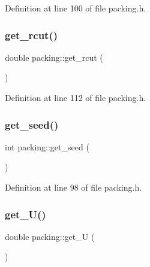 Definition at line 100 of file packing.\+h.

\mbox{\label{classpacking_a9485b9495dbedd5d954bade26a3033b7}} 
\subsubsection{\texorpdfstring{get\+\_\+rcut()}{get\_rcut()}}
{\footnotesize\ttfamily double packing\+::get\+\_\+rcut (\begin{DoxyParamCaption}{ }\end{DoxyParamCaption})\hspace{0.3cm}{\ttfamily [inline]}}



Definition at line 112 of file packing.\+h.

\mbox{\label{classpacking_ac99ab03b903298da3ac29dde9fdd4ad1}} 
\subsubsection{\texorpdfstring{get\+\_\+seed()}{get\_seed()}}
{\footnotesize\ttfamily int packing\+::get\+\_\+seed (\begin{DoxyParamCaption}{ }\end{DoxyParamCaption})\hspace{0.3cm}{\ttfamily [inline]}}



Definition at line 98 of file packing.\+h.

\mbox{\label{classpacking_ac2544dd44e1dd8bfb08315f94d543bc3}} 
\subsubsection{\texorpdfstring{get\+\_\+\+U()}{get\_U()}}
{\footnotesize\ttfamily double packing\+::get\+\_\+U (\begin{DoxyParamCaption}{ }\end{DoxyParamCaption})\hspace{0.3cm}{\ttfamily [inline]}}



